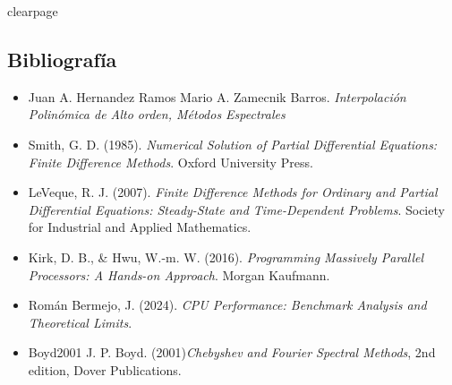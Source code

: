 clearpage

\subsection{Bibliografía}

\begin{itemize}
    \item Juan A. Hernandez Ramos 
Mario A. Zamecnik Barros. \textit{Interpolación Polinómica de Alto orden, Métodos Espectrales}
    \item Smith, G. D. (1985). \textit{Numerical Solution of Partial Differential Equations: Finite Difference Methods}. Oxford University Press.
    \item LeVeque, R. J. (2007). \textit{Finite Difference Methods for Ordinary and Partial Differential Equations: Steady-State and Time-Dependent Problems}. Society for Industrial and Applied Mathematics.
    \item Kirk, D. B., \& Hwu, W.-m. W. (2016). \textit{Programming Massively Parallel Processors: A Hands-on Approach}. Morgan Kaufmann.
    \item Román Bermejo, J. (2024). \textit{CPU Performance: Benchmark Analysis and Theoretical Limits}.
    \item{Boyd2001}
J. P. Boyd. (2001)\textit{Chebyshev and Fourier Spectral Methods}, 2nd edition, Dover Publications.

 
\end{itemize}
